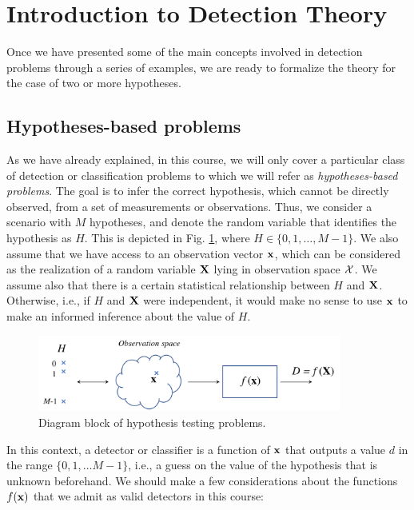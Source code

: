 \section{Introduction to Detection Theory}
\label{sec:SDT}

Once we have presented some of the main concepts involved in detection problems through a series of examples, we are ready to formalize the theory for the case of two or more hypotheses.

\subsection{Hypotheses-based problems}
\label{subsec:hypotheses_problems}

As we have already explained, in this course, we will only cover a particular class of detection or classification problems to which we will refer as {\em hypotheses-based problems}. The goal is to infer the correct hypothesis, which cannot be directly observed, from a set of measurements or observations.  Thus, we consider a scenario with $M$ hypotheses, and denote the random variable that identifies the hypothesis as $H$. This is depicted in Fig. \ref{fig:clas_overview}, where $H \in \{0, 1, \ldots, M-1\}$. We also assume that we have access to an observation vector $\bf x$, which can be considered as the realization of a random variable $\bf X$ lying in observation space $\cal X$. We assume also that there is a certain statistical relationship between $H$ and $\bf X$. Otherwise, i.e., if $H$ and $\bf X$ were independent, it would make no sense to use $\bf x$ to make an informed inference about the value of $H$.

    \begin{figure}
        \begin{center}
            \includegraphics[width=10cm]{Figures//classification_overview.png}
        \end{center}
        \caption{Diagram block of hypothesis testing problems.\label{fig:clas_overview}}
    \end{figure}

In this context, a detector or classifier is a function of $\bf x$ that outputs a value $d$ in the range $\{0, 1, \ldots M-1\}$, i.e., a guess on the value of the hypothesis that is unknown beforehand. We should make a few considerations about the functions $f({\bf x})$ that we admit as valid detectors in this course:

